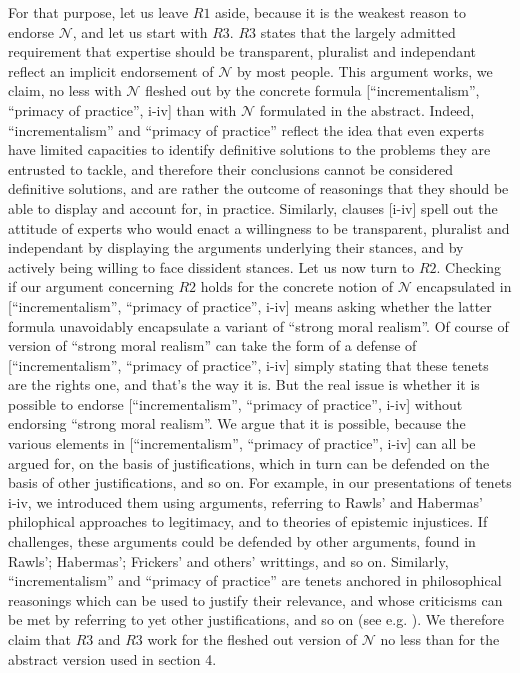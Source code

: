 \documentclass[preprint, french, english, 11pt, authoryear]{elsarticle}%
\newcommand{\adv}{\mathscr{N}}
\begin{document}
For that purpose, let us leave $R1$ aside, because it is the weakest reason to endorse $\adv$, and let us start with $R3$. $R3$ states that the largely admitted requirement that expertise should be transparent, pluralist and independant reflect an implicit endorsement of $\adv$ by most people. This argument works, we claim, no less with $\adv$ fleshed out by the concrete formula [``incrementalism'', ``primacy of practice'', i-iv] than with $\adv$ formulated in the abstract. Indeed, ``incrementalism'' and ``primacy of practice'' reflect the idea that even experts have limited capacities to identify definitive solutions to the problems they are entrusted to tackle, and therefore their conclusions cannot be considered definitive solutions, and are rather the outcome of reasonings that they should be able to display and account for, in practice. Similarly, clauses [i-iv] spell out the attitude of experts who would enact a willingness to be transparent, pluralist and independant by displaying the arguments underlying their stances, and by actively being willing to face dissident stances.
Let us now turn to $R2$. Checking if our argument concerning $R2$ holds for the concrete notion of $\adv$ encapsulated in [``incrementalism'', ``primacy of practice'', i-iv] means asking whether the latter formula unavoidably encapsulate a variant of ``strong moral realism''. Of course of version of ``strong moral realism'' can take the form of a defense of [``incrementalism'', ``primacy of practice'', i-iv] simply stating that these tenets are the rights one, and that's the way it is. But the real issue is whether it is possible to endorse [``incrementalism'', ``primacy of practice'', i-iv] without endorsing ``strong moral realism''. We argue that it is possible, because the various elements in [``incrementalism'', ``primacy of practice'', i-iv] can all be argued for, on the basis of justifications, which in turn can be defended on the basis of other justifications, and so on. For example, in our presentations of tenets i-iv, we introduced them using arguments, referring to Rawls' and Habermas' philophical approaches to legitimacy, and to theories of epistemic injustices. If challenges, these arguments could be defended by other arguments, found in Rawls'; Habermas'; Frickers' and others' writtings, and so on. Similarly, ``incrementalism'' and ``primacy of practice'' are tenets anchored in philosophical reasonings which can be used to justify their relevance, and whose criticisms can be met by referring to yet other justifications, and so on (see e.g. \citet{meinard_du_2013}). We therefore claim that $R3$ and $R3$ work for the fleshed out version of $\adv$ no less than for the abstract version used in section 4.
\end{document}
